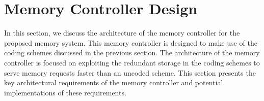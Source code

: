 
\section{Memory Controller Design}
\label{sec:memcontrol}
In this section, we discuss the architecture of the memory controller for the proposed memory system. This memory controller is designed to make use of the coding schemes discussed in the previous section. The architecture of the memory controller is focused on exploiting the redundant storage in the coding schemes to serve memory requests faster than an uncoded scheme. This section presents the key architectural requirements of the memory controller and potential implementations of these requirements.

